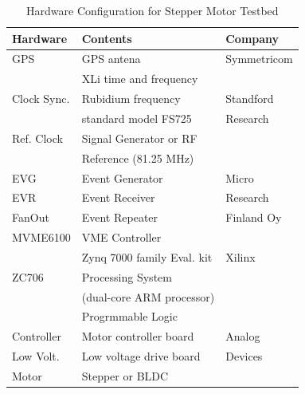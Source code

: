 \documentclass[a4paper,
              ]{jacow}
\begin{document}
\begin{table}[h!t]
    \setlength\tabcolsep{3.8pt}
    \caption{Hardware Configuration for Stepper Motor Testbed}
    \label{hw-conf}
    
   \begin{tabular}{@{}lll@{}}
        \toprule
        \textbf{Hardware} & \textbf{Contents}                  & \textbf{Company}     \\
        \midrule
         GPS          & GPS antena                            & Symmetricom          \\
                      & XLi time and frequency                &                       \\         
         Clock Sync.  & Rubidium frequency                    & Standford           \\
                      & standard model FS725                  & Research           \\         
         Ref. Clock   & Signal Generator or RF                &                       \\
                      & Reference (81.25 MHz)                 &                       \\
        \midrule
         EVG          & Event Generator                       & Micro                      \\
         EVR          & Event Receiver                        & Research                      \\
         FanOut       & Event Repeater                        & Finland Oy                 \\
         MVME6100     & VME Controller                        &                       \\

        \midrule
                      & Zynq 7000 family Eval. kit            & Xilinx                \\
         ZC706        & Processing System                     &                       \\
                      & (dual-core ARM processor)             &                       \\
                      & Progrmmable Logic                     &                       \\
        \midrule
         Controller   & Motor controller board                & Analog                \\
         Low Volt.    & Low voltage drive board               & Devices               \\
        \midrule
         Motor        & Stepper or BLDC                       &                       \\
                         
        \bottomrule
        
     \end{tabular}
 \end{table}
 
\end{document}
